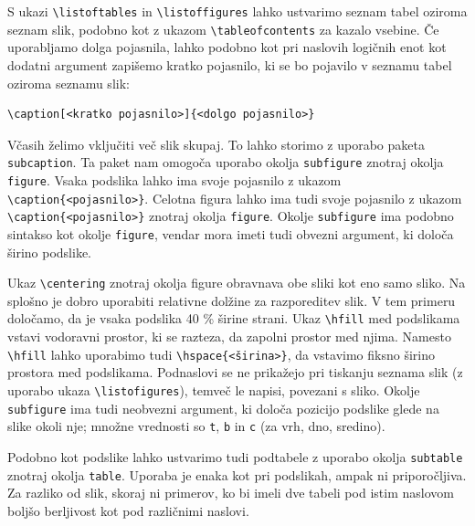 \begin{example}\label{eg-floating-2}\end{example}S ukazi \texttt{{\textbackslash}listoftables} in \texttt{{\textbackslash}listoffigures} lahko ustvarimo seznam tabel oziroma seznam slik, podobno kot z ukazom \texttt{{\textbackslash}tableofcontents} za kazalo vsebine.
Če uporabljamo dolga pojasnila, lahko podobno kot pri naslovih logičnih enot kot dodatni argument zapišemo kratko pojasnilo, ki se bo pojavilo v seznamu tabel oziroma seznamu slik:

\begin{verbatim}
\caption[<kratko pojasnilo>]{<dolgo pojasnilo>}
\end{verbatim}

Včasih želimo vključiti več slik skupaj. To lahko storimo z uporabo paketa \texttt{subcaption}.
Ta paket nam omogoča uporabo okolja \texttt{subfigure} znotraj okolja \texttt{figure}.
Vsaka podslika lahko ima svoje pojasnilo z ukazom \texttt{{\textbackslash}caption\{\textless pojasnilo\textgreater \}}.
Celotna figura lahko ima tudi svoje pojasnilo z ukazom \texttt{{\textbackslash}caption\{\textless pojasnilo\textgreater \}} znotraj okolja \texttt{figure}.
Okolje \texttt{subfigure} ima podobno sintakso kot okolje \texttt{figure}, vendar mora imeti tudi obvezni argument, ki določa širino podslike.

\begin{example}\label{eg-floating-3}\end{example}Ukaz \texttt{{\textbackslash}centering} znotraj okolja figure obravnava obe sliki kot eno samo sliko.
Na splošno je dobro uporabiti relativne dolžine za razporeditev slik. V tem primeru določamo, da je vsaka podslika 40 \% širine strani.
Ukaz \texttt{{\textbackslash}hfill} med podslikama vstavi vodoravni prostor, ki se razteza, da zapolni prostor med njima.
Namesto \texttt{{\textbackslash}hfill} lahko uporabimo tudi \texttt{{\textbackslash}hspace\{\textless širina\textgreater \}}, da vstavimo fiksno širino prostora med podslikama.
Podnaslovi se ne prikažejo pri tiskanju seznama slik (z uporabo ukaza \texttt{{\textbackslash}listofigures}), temveč le napisi, povezani s sliko.
Okolje \texttt{subfigure} ima tudi neobvezni argument, ki določa pozicijo podslike glede na slike okoli nje; množne vrednosti so \texttt{t}, \texttt{b} in \texttt{c} (za vrh, dno, sredino).

Podobno kot podslike lahko ustvarimo tudi podtabele z uporabo okolja \texttt{subtable} znotraj okolja \texttt{table}.
Uporaba je enaka kot pri podslikah, ampak ni priporočljiva.
Za razliko od slik, skoraj ni primerov, ko bi imeli dve tabeli pod istim naslovom boljšo berljivost kot pod različnimi naslovi.

